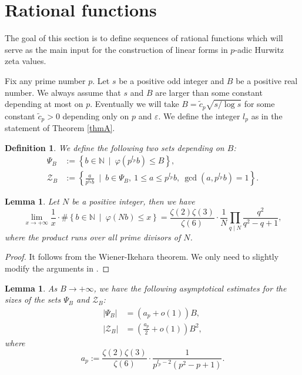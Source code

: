 \documentclass[12pt]{article}
\newtheorem{lemma}[theorem]{Lemma}
\newtheorem{definition}[theorem]{Definition}
\numberwithin{equation}{section}
\begin{document}
\section{Rational functions}\label{sec:Rational}
The goal of this section is to define sequences of rational functions which will serve as the main input for the construction of linear forms in $p$-adic Hurwitz zeta values.

Fix any prime number $p$. Let $s$ be a positive odd integer and $B$ be a positive real number. We always assume that $s$ and $B$ are larger than some constant depending at most on $p$. Eventually we will take $B = \widetilde{c}_p \sqrt{s/\log s}$ for some constant $\widetilde{c}_p>0$ depending only on $p$ and $\varepsilon$. We define the integer $l_p$ as in the statement of Theorem \ref{thmA}.

\begin{definition}
We define the following two sets depending on $B$:
    \begin{align*}
    \Psi_B &:=   \left\{ b \in \mathbb{N} ~\mid~ \varphi(p^{l_p}b) \leqslant B \right\},\\
    \mathcal{Z}_B &:= \left\{ \frac{a}{p^{l_p}b} ~\mid~ b \in \Psi_B,~1 \leqslant a \leqslant p^{l_p}b,~\gcd(a,p^{l_p}b)=1   \right\}.
    \end{align*}
\end{definition}

\begin{lemma}\label{lemma_inverse_totient}
	Let $N$ be a positive integer, then we have
	\[ \lim_{x \rightarrow +\infty} \frac{1}{x} \cdot \#\left\{ b \in \mathbb{N} ~\mid~ \varphi(Nb) \leqslant x \right\} = \frac{\zeta(2)\zeta(3)}{\zeta(6)}\cdot \frac{1}{N}\prod_{q \mid N} \frac{q^2}{q^2-q+1}, \]
 where the product runs over all prime divisors of $N$.
\end{lemma}

\begin{proof}
	It follows from the Wiener-Ikehara theorem. We only need to slightly modify the arguments in \cite[\S 2]{Bat1972}.
\end{proof}

\begin{lemma}\label{lemma_sizes_of_sets}
    As $B \rightarrow +\infty$, we have the following asymptotical estimates for the sizes of the sets $\Psi_B$ and $\mathcal{Z}_B$:  
	\begin{align}
            |\Psi_B| &= (a_p + o(1))B, \label{size_of_Psi_B}\\
            |\mathcal{Z}_B| &= \left( \frac{a_p}{2} + o(1)\right)B^2, \label{size_of_Z_B}
	\end{align} 
    where
    \begin{equation}\label{def_a_p}
        a_p := \frac{\zeta(2)\zeta(3)}{\zeta(6)}\cdot\frac{1}{p^{l_p-2}(p^2-p+1)}.
    \end{equation}
	
\end{lemma}
\end{document}
